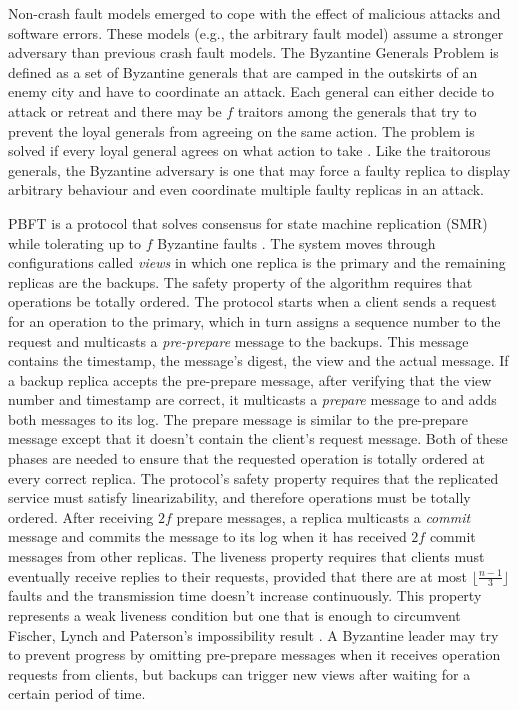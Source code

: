 \documentclass[runningheads,a4paper]{llncs}
\begin{document}
Non-crash fault models emerged to cope with the effect of malicious attacks and software errors. These models (e.g., the arbitrary fault model) assume a stronger adversary than previous crash fault models. The Byzantine Generals Problem is defined as a set of Byzantine generals that are camped in the outskirts of an enemy city and have to coordinate an attack. Each general can either decide to attack or retreat and there may be $f$ traitors among the generals that try to prevent the loyal generals from agreeing on the same action. The problem is solved if every loyal general agrees on what action to take \cite{Lamport1982}. Like the traitorous generals, the Byzantine adversary is one that may force a faulty replica to display arbitrary behaviour and even coordinate multiple faulty replicas in an attack. \par
PBFT is a protocol that solves consensus for state machine replication (SMR) while tolerating up to $f$ Byzantine faults \cite{Castro1999}. The system moves through configurations called \textit{views} in which one replica is the primary and the remaining replicas are the backups. The safety property of the algorithm requires that operations be totally ordered. The protocol starts when a client sends a request for an operation to the primary, which in turn assigns a sequence number to the request and multicasts a \textit{pre-prepare} message to the backups. This message contains the timestamp, the message's digest, the view and the actual message. If a backup replica accepts the pre-prepare message, after verifying that the view number and timestamp are correct, it multicasts a \textit{prepare} message to and adds both messages to its log. The prepare message is similar to the pre-prepare message except that it doesn't contain the client's request message. Both of these phases are needed to ensure that the requested operation is totally ordered at every correct replica. The protocol's safety property requires that the replicated service must satisfy linearizability, and therefore operations must be totally ordered. After receiving $2f$ prepare messages, a replica multicasts a \textit{commit} message and commits the message to its log when it has received $2f$ commit messages from other replicas. The liveness property requires that clients must eventually receive replies to their requests, provided that there are at most $\lfloor\frac{n-1}{3}\rfloor$ faults and the transmission time doesn't increase continuously. This property represents a weak liveness condition but one that is enough to circumvent Fischer, Lynch and Paterson's impossibility result \cite{Fischer1985}. A Byzantine leader may try to prevent progress by omitting pre-prepare messages when it receives operation requests from clients, but backups can trigger new views after waiting for a certain period of time. \par
\end{document}

